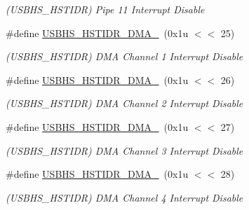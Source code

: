 \begin{DoxyCompactItemize}
\begin{DoxyCompactList}\small\item\em (U\+S\+B\+H\+S\+\_\+\+H\+S\+T\+I\+DR) Pipe 11 Interrupt Disable \end{DoxyCompactList}\item 
\mbox{\label{group__SAME70__USBHS_ga093461bf7b81f1b606d9362880f396f1}} 
\#define \mbox{\hyperlink{group__SAME70__USBHS_ga093461bf7b81f1b606d9362880f396f1}{U\+S\+B\+H\+S\+\_\+\+H\+S\+T\+I\+D\+R\+\_\+\+D\+M\+A\+\_}}~(0x1u $<$$<$ 25)
\begin{DoxyCompactList}\small\item\em (U\+S\+B\+H\+S\+\_\+\+H\+S\+T\+I\+DR) D\+MA Channel 1 Interrupt Disable \end{DoxyCompactList}\item 
\mbox{\label{group__SAME70__USBHS_ga918da75c8395361aa6433e3f7f0d698d}} 
\#define \mbox{\hyperlink{group__SAME70__USBHS_ga918da75c8395361aa6433e3f7f0d698d}{U\+S\+B\+H\+S\+\_\+\+H\+S\+T\+I\+D\+R\+\_\+\+D\+M\+A\+\_}}~(0x1u $<$$<$ 26)
\begin{DoxyCompactList}\small\item\em (U\+S\+B\+H\+S\+\_\+\+H\+S\+T\+I\+DR) D\+MA Channel 2 Interrupt Disable \end{DoxyCompactList}\item 
\mbox{\label{group__SAME70__USBHS_gac7209c9ffead11cc6099d64f2f2c902f}} 
\#define \mbox{\hyperlink{group__SAME70__USBHS_gac7209c9ffead11cc6099d64f2f2c902f}{U\+S\+B\+H\+S\+\_\+\+H\+S\+T\+I\+D\+R\+\_\+\+D\+M\+A\+\_}}~(0x1u $<$$<$ 27)
\begin{DoxyCompactList}\small\item\em (U\+S\+B\+H\+S\+\_\+\+H\+S\+T\+I\+DR) D\+MA Channel 3 Interrupt Disable \end{DoxyCompactList}\item 
\mbox{\label{group__SAME70__USBHS_ga2241db1c6d32aad6273c7ff2d74cb1bb}} 
\#define \mbox{\hyperlink{group__SAME70__USBHS_ga2241db1c6d32aad6273c7ff2d74cb1bb}{U\+S\+B\+H\+S\+\_\+\+H\+S\+T\+I\+D\+R\+\_\+\+D\+M\+A\+\_}}~(0x1u $<$$<$ 28)
\begin{DoxyCompactList}\small\item\em (U\+S\+B\+H\+S\+\_\+\+H\+S\+T\+I\+DR) D\+MA Channel 4 Interrupt Disable \end{DoxyCompactList}\item 

\end{DoxyCompactItemize}
